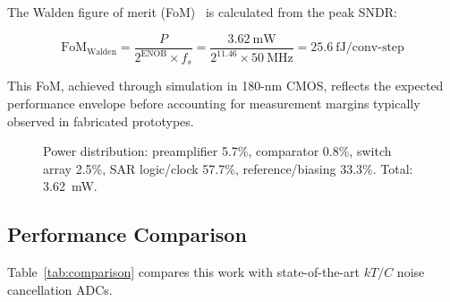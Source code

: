 \documentclass[journal]{IEEEtran}
\begin{document}
The Walden figure of merit (FoM)~\cite{murmann2015adc} is calculated from the peak SNDR:

\begin{equation}
\text{FoM}_{\text{Walden}} = \frac{P}{2^{\text{ENOB}} \times f_s} = \frac{3.62~\text{mW}}{2^{11.46} \times 50~\text{MHz}} = 25.6~\text{fJ/conv-step}
\label{eq:fom}
\end{equation}

This FoM, achieved through simulation in 180-nm CMOS, reflects the expected performance envelope before accounting for measurement margins typically observed in fabricated prototypes.

\begin{figure}[!t]
\centering
{}
\caption{Power distribution: preamplifier 5.7\%, comparator 0.8\%, switch array 2.5\%, SAR logic/clock 57.7\%, reference/biasing 33.3\%. Total: 3.62~mW.}
\label{fig:power}
\end{figure}

\subsection{Performance Comparison}

Table~\ref{tab:comparison} compares this work with state-of-the-art $kT/C$ noise cancellation ADCs.
\end{document}
